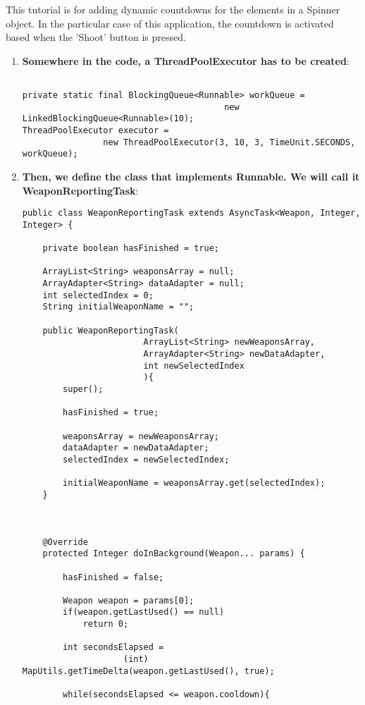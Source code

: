 
This tutorial is for adding dynamic countdowns for the elements in a Spinner
object. In the particular case of this application, the countdown is activated
based when the 'Shoot' button is pressed.\newline
\begin{enumerate}
  \item \textbf{Somewhere in the code, a ThreadPoolExecutor has to be created}:
  
\begin{verbatim}

private static final BlockingQueue<Runnable> workQueue = 
										new LinkedBlockingQueue<Runnable>(10);
ThreadPoolExecutor executor = 
				new ThreadPoolExecutor(3, 10, 3, TimeUnit.SECONDS, workQueue);
\end{verbatim}
	
  \item \textbf{Then, we define the class that implements Runnable. We will call
  it WeaponReportingTask}:

\begin{verbatim}
public class WeaponReportingTask extends AsyncTask<Weapon, Integer, Integer> {	
  		
	private boolean hasFinished = true;
	
	ArrayList<String> weaponsArray = null;
	ArrayAdapter<String> dataAdapter = null;
	int selectedIndex = 0;
	String initialWeaponName = "";	
	
	public WeaponReportingTask(
						ArrayList<String> newWeaponsArray, 
						ArrayAdapter<String> newDataAdapter,
						int newSelectedIndex
						){		
		super();
		
		hasFinished = true;
		
		weaponsArray = newWeaponsArray;
		dataAdapter = newDataAdapter;
		selectedIndex = newSelectedIndex;
		
		initialWeaponName = weaponsArray.get(selectedIndex);
	}
	
	

	@Override
 	protected Integer doInBackground(Weapon... params) {
	
		hasFinished = false;
		
		Weapon weapon = params[0];
 		if(weapon.getLastUsed() == null) 
 			return 0;
 		
 		int secondsElapsed = 
 					(int) MapUtils.getTimeDelta(weapon.getLastUsed(), true);
 		
 		while(secondsElapsed <= weapon.cooldown){
 			

\end{verbatim}
\end{enumerate}

